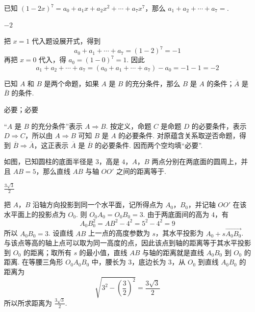 \documentclass[UTF8,a4paper,oneside,11pt]{ctexbook}
\begin{document}
\begin{problem}
已知 \((1 - 2x)^7 = a_0 + a_1x + a_2x^2 + \cdots + a_7x^7\)，那么 \(a_1 + a_2 + \cdots + a_7 = \)\fillinblank{}.
\end{problem}

\begin{answer}
\(-2\)
\end{answer}

\begin{solution}
把 \(x=1\) 代入题设展开式，得到
\[
a_0+a_1+\cdots+a_7=(1-2)^7=-1
\]
再把 \(x=0\) 代入，得 \(a_0=(1-0)^7=1\). 因此
\[
a_1+a_2+\cdots+a_7=(a_0+a_1+\cdots+a_7)-a_0=-1-1=-2
\]
\end{solution}

\begin{problem}
已知 \(A\) 和 \(B\) 是两个命题，如果 \(A\) 是 \(B\) 的充分条件，那么 \(B\) 是 \(A\) 的\fillinblank{}条件；\(\overline{A}\) 是 \(\overline{B}\) 的\fillinblank{}条件.
\end{problem}

\begin{answer}
必要；必要
\end{answer}

\begin{solution}
“\(A\) 是 \(B\) 的充分条件”表示 \(A\Rightarrow B\). 按定义，命题 \(C\) 是命题 \(D\) 的必要条件，表示 \(D\Rightarrow C\)，所以由 \(A\Rightarrow B\) 可知 \(B\) 是 \(A\) 的必要条件. 对原蕴含关系取逆否命题，得到 \(\overline{B}\Rightarrow\overline{A}\)，这正表示 \(\overline{A}\) 是 \(\overline{B}\) 的必要条件. 因而两个空均填“必要”.
\end{solution}

\begin{problem}
如图，已知圆柱的底面半径是 \(3\)，高是 \(4\)，\(A\)，\(B\) 两点分别在两底面的圆周上，并且 \(AB = 5\)，那么直线 \(AB\) 与轴 \(OO'\) 之间的距离等于\fillinblank{}.

\end{problem}

\begin{answer}
\(\frac{3\sqrt{3}}{2}\)
\end{answer}

\begin{solution}
把 \(A\)，\(B\) 沿轴方向投影到同一个水平面，记所得点为 \(A_0\)，\(B_0\)，并记轴 \(OO'\) 在该水平面上的投影点为 \(O_0\). 则 \(O_0A_0=O_0B_0=3\). 由于两底面间的高为 \(4\)，有
\[
A_0B_0^2=AB^2-4^2=5^2-4^2=9
\]
所以 \(A_0B_0=3\). 设直线 \(AB\) 上一点的高度参数为 \(s\)，其水平投影为 \(A_0+s\overrightarrow{A_0B_0}\). 与该点等高的轴上点可以取为同一高度的点，因此该点到轴的距离等于其水平投影到 \(O_0\) 的距离；取所有 \(s\) 的最小值，直线 \(AB\) 与轴的距离就是直线 \(A_0B_0\) 到 \(O_0\) 的距离. 在等腰三角形 \(O_0A_0B_0\) 中，腰长为 \(3\)，底边长为 \(3\)，从 \(O_0\) 到直线 \(A_0B_0\) 的距离为
\[
\sqrt{3^2-\left(\frac32\right)^2}=\frac{3\sqrt3}{2}
\]
所以所求距离为 \(\frac{3\sqrt3}{2}\).
\end{solution}
\end{document}
